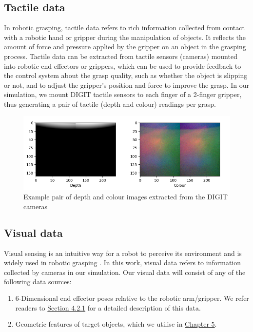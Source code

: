 \documentclass[11pt, a4paper]{report}
\begin{document}
\newpage
\subsection{Tactile data}\label{sec:3.2.1}
In robotic grasping, tactile data refers to rich information collected from contact with a robotic hand or gripper during the manipulation of objects. It reflects the amount of force and pressure applied by the gripper on an object in the grasping process. Tactile data can be extracted from tactile sensors (cameras) mounted into robotic end effectors or grippers, which can be used to provide feedback to the control system about the grasp quality, such as whether the object is slipping or not, and to adjust the gripper's position and force to improve the grasp. In our simulation, we mount DIGIT tactile sensors \cite{Lambeta2020DIGIT} to each finger of a 2-finger gripper, thus generating a pair of tactile (depth and colour) readings per grasp.
\begin{figure}[H]
    \centering
    \includegraphics[width=\textwidth]{docs/Project Report/Media/4_2_tactile_data_visualisation.png}
    \caption{Example pair of depth and colour images extracted from the DIGIT cameras}
    \label{fig:3.4}
\end{figure}


\subsection{Visual data}\label{sec:3.2.2}
Visual sensing is an intuitive way for a robot to perceive its environment and is widely used in robotic grasping \cite{GUO2017274}. In this work, visual data refers to information collected by cameras in our simulation. Our visual data will consist of any of the following data sources:
\begin{enumerate}
    \item 6-Dimensional end effector poses relative to the robotic arm/gripper. We refer readers to \hyperref[sec:4.2.1]{Section 4.2.1} for a detailed description of this data.
    \item Geometric features of target objects, which we utilise in \hyperref[chap:5]{Chapter 5}.
\end{enumerate}
\end{document}
